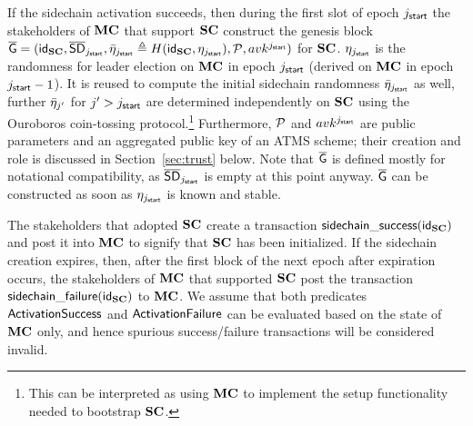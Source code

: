     If the sidechain activation succeeds, then during the first slot of epoch $j_{\mathsf{start}}$
    the stakeholders of $\mathbf{MC}$ that support $\mathbf{SC}$  construct the genesis block
    $
    \mathsf{\overline{G}}
    =(
      \mathsf{id}_{\mathbf{SC}},\allowbreak
      \mathsf{\overline{SD}}_{j_{\mathsf{start}}},\allowbreak
      \bar{\eta}_{j_{\mathsf{start}}}\triangleq H( \mathsf{id}_{\mathbf{SC}}, \eta_{j_{\mathsf{start}}}),\allowbreak
      \mathcal{P},\allowbreak
      avk^{j_{\mathsf{start}}}
    )
    $
    for $\mathbf{SC}$. $\eta_{j_{\mathsf{start}}}$ is the
    randomness for leader election on $\mathbf{MC}$ in epoch $j_{\mathsf{start}}$ (derived
    on $\mathbf{MC}$ in epoch $j_{\mathsf{start}}-1$). It is reused to compute the
    initial sidechain randomness
    $\bar{\eta}_{j_{\mathsf{start}}}$ as well, further
    $\bar{\eta}_{j'}$ for $j'>j_{\mathsf{start}}$ are determined independently on $\mathbf{SC}$ using
    the Ouroboros coin-tossing protocol.\footnote{This can be interpreted as
    using $\mathbf{MC}$ to implement the setup functionality needed to bootstrap $\mathbf{SC}$.
    }
    Furthermore, $\mathcal{P}$ and $avk^{j_{\mathsf{start}}}$ are public parameters and an aggregated public
    key of an ATMS scheme; their creation and role is
    discussed in Section~\ref{sec:trust} below.
    Note that $\mathsf{\overline{G}}$ is defined mostly for notational compatibility, as
    $\mathsf{\overline{SD}}_{j_{\mathsf{start}}}$ is empty at this point anyway.
    $\mathsf{\overline{G}}$ can be constructed as soon as %
    $\eta_{j_{\mathsf{start}}}$ is known and stable.

    The stakeholders that adopted $\mathbf{SC}$
    create a transaction
    $\mathsf{sidechain\_success}(\mathsf{id}_{\mathbf{SC}})$
    and post it into $\mathbf{MC}$
    to signify that $\mathbf{SC}$ has been initialized.
    If the sidechain creation expires, then, after the first block of the next
    epoch after expiration occurs, the stakeholders of $\mathbf{MC}$ that supported
    $\mathbf{SC}$ post the transaction $\mathsf{sidechain\_failure}(\mathsf{id}_{\mathbf{SC}})$ to $\mathbf{MC}$.
    We assume that both predicates $\mathsf{ActivationSuccess}$ and $\mathsf{ActivationFailure}$ can be evaluated
    based on the state of $\mathbf{MC}$ only, and hence spurious success/failure
    transactions will be considered invalid.

